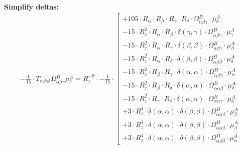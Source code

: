 \documentclass{article}
\begin{document}
\textbf{Simplify deltas:}
\begin{subequations}\begin{gather}
- \frac{1}{15} \cdot T_{\alpha{}\beta{}\gamma{}\delta{}} \Omega{}^{B}_{\alpha{}\beta{}\gamma{}} \mu{}^{A}_{\delta{}} = R_{z}^{-9} \cdot - \frac{1}{15} \cdot  \left[ \begin{array}{c} 
 		+ 105 \cdot R_{\alpha{}} \cdot R_{\beta{}} \cdot R_{\gamma{}} \cdot R_{\delta{}} \cdot \Omega{}^{B}_{\alpha{}\beta{}\gamma{}} \cdot \mu{}^{A}_{\delta{}} 
 \\[0.2em] 		 - 15 \cdot R_{z}^{2} \cdot R_{\alpha{}} \cdot R_{\beta{}} \cdot \delta{}\left(\gamma{}, \gamma{}\right) \cdot \Omega{}^{B}_{\alpha{}\beta{}\gamma{}} \cdot \mu{}^{A}_{\gamma{}} 
 \\[0.2em] 		 - 15 \cdot R_{z}^{2} \cdot R_{\alpha{}} \cdot R_{\gamma{}} \cdot \delta{}\left(\beta{}, \beta{}\right) \cdot \Omega{}^{B}_{\alpha{}\beta{}\gamma{}} \cdot \mu{}^{A}_{\beta{}} 
 \\[0.2em] 		 - 15 \cdot R_{z}^{2} \cdot R_{\alpha{}} \cdot R_{\delta{}} \cdot \delta{}\left(\beta{}, \beta{}\right) \cdot \Omega{}^{B}_{\alpha{}\beta{}\beta{}} \cdot \mu{}^{A}_{\delta{}} 
 \\[0.2em] 		 - 15 \cdot R_{z}^{2} \cdot R_{\beta{}} \cdot R_{\gamma{}} \cdot \delta{}\left(\alpha{}, \alpha{}\right) \cdot \Omega{}^{B}_{\alpha{}\beta{}\gamma{}} \cdot \mu{}^{A}_{\alpha{}} 
 \\[0.2em] 		 - 15 \cdot R_{z}^{2} \cdot R_{\beta{}} \cdot R_{\delta{}} \cdot \delta{}\left(\alpha{}, \alpha{}\right) \cdot \Omega{}^{B}_{\alpha{}\alpha{}\beta{}} \cdot \mu{}^{A}_{\delta{}} 
 \\[0.2em] 		 - 15 \cdot R_{z}^{2} \cdot R_{\gamma{}} \cdot R_{\delta{}} \cdot \delta{}\left(\alpha{}, \alpha{}\right) \cdot \Omega{}^{B}_{\alpha{}\alpha{}\gamma{}} \cdot \mu{}^{A}_{\delta{}} 
 \\[0.2em] 		 + 3 \cdot R_{z}^{4} \cdot \delta{}\left(\alpha{}, \alpha{}\right) \cdot \delta{}\left(\beta{}, \beta{}\right) \cdot \Omega{}^{B}_{\alpha{}\alpha{}\beta{}} \cdot \mu{}^{A}_{\beta{}} 
 \\[0.2em] 		 + 3 \cdot R_{z}^{4} \cdot \delta{}\left(\alpha{}, \alpha{}\right) \cdot \delta{}\left(\beta{}, \beta{}\right) \cdot \Omega{}^{B}_{\alpha{}\alpha{}\beta{}} \cdot \mu{}^{A}_{\beta{}} 
 \\[0.2em] 		 + 3 \cdot R_{z}^{4} \cdot \delta{}\left(\alpha{}, \alpha{}\right) \cdot \delta{}\left(\beta{}, \beta{}\right) \cdot \Omega{}^{B}_{\alpha{}\beta{}\beta{}} \cdot \mu{}^{A}_{\alpha{}}

\end{array}
\end{gather}
\end{subequations}
\end{document}
